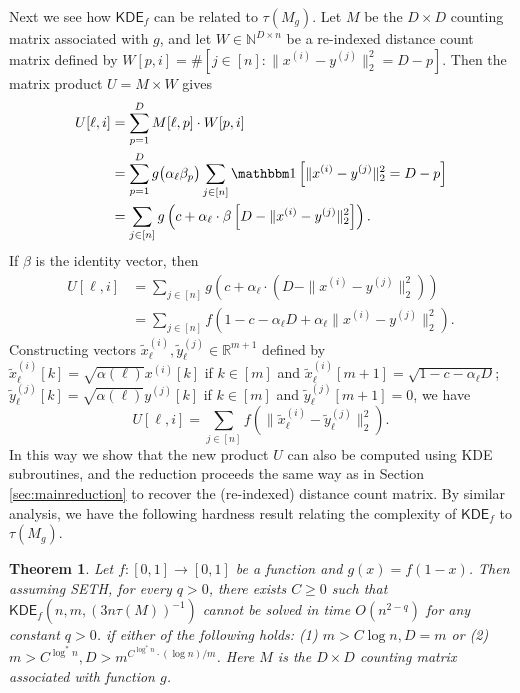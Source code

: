 \documentclass[10pt,a4paper]{article}
\newtheorem{theorem}{Theorem}
\theoremstyle{remark}
\numberwithin{equation}{section}
\numberwithin{theorem}{section}
\newcommand{\N}{\ensuremath{\mathbb{N}}}
\newcommand{\R}{\ensuremath{\mathbb{R}}}
\newcommand{\ind}{\mathbbm 1}
\newcommand{\KDE}{\mathsf{KDE}}
\begin{document}
Next we see how $\KDE_f$ can be related to $\tau(M_g)$. Let $M$ be the $D \times D$ counting matrix associated with $g$, and let $W \in \N^{D\times n}$ be a re-indexed distance count matrix defined by $W[p, i] = \#[j\in [n]: \|x^{(i)}-y^{(j)}\|_2^2 = D-p]$. Then the matrix product $U = M \times W$ gives 
\begin{align}
U[\ell, i] &= \sum_{p=1}^D M[\ell, p] \cdot W[p, i] \notag\\ 
&=\sum_{p=1}^D g\big(\alpha_\ell\beta_p\big) 
\sum_{j \in [n]} \ind\left[\|x^{(i)} - y^{(j)}\|_2^2 = D-p\right] \notag\\
&=\sum_{j \in [n]} g\left(c + \alpha_\ell \cdot \beta\left[D-\|x^{(i)} - y^{(j)}\|_2^2\right]\right).
\end{align}
If $\beta$ is the identity vector, then
\begin{align*}
U[\ell, i] &=\sum_{j \in [n]} g\left(c + \alpha_\ell \cdot (D-\|x^{(i)} - y^{(j)}\|_2^2)\right) \\
&=\sum_{j \in [n]} f\left(1 - c - \alpha_\ell D + \alpha_\ell \|x^{(i)} - y^{(j)}\|_2^2 \right).
\end{align*}
Constructing vectors $\tilde x_{\ell}^{(i)}, \tilde y_{\ell}^{(j)} \in \R^{m+1}$ defined by $\tilde x_{\ell}^{(i)}[k] = \sqrt{\alpha(\ell)} x^{(i)}[k]$ if $k \in [m]$ and $\tilde x_{\ell}^{(i)}[m+1] = \sqrt {1-c-\alpha_{\ell}D}$;
$\tilde y_{\ell}^{(j)}[k] = \sqrt{\alpha(\ell)} y^{(j)}[k]$ if $k \in [m]$ and $\tilde y_{\ell}^{(j)}[m+1] = 0$,
we have
\[U[\ell, i] = \sum_{j \in [n]}f(\|\tilde x_{\ell}^{(i)} - \tilde y_\ell^{(j)}\|_2^2).\]
In this way we show that the new product $U$ can also be computed using KDE subroutines, and the reduction proceeds the same way as in Section \ref{sec:mainreduction} to recover the (re-indexed) distance count matrix.
By similar analysis, we have the following hardness result relating the complexity of $\KDE_f$ to $\tau(M_g)$.
\begin{theorem} \label{thm:pdkdehardness}
Let $f: [0, 1]\rightarrow [0, 1]$ be a function and $g(x) = f(1-x)$.
Then assuming SETH, for every $q > 0$, there exists $C \ge 0$ such that $\KDE_f(n, m, (3n\tau(M))^{-1})$
cannot be solved in time $O(n^{2-q})$ for any constant $q>0$. if either of the following holds: (1) $m > C \log n, D = m$ or (2) $m > C^{\log^* n}, D > m^{C^{\log^* n} \cdot (\log n)/m}$. Here $M$ is the $D \times D$ counting matrix associated with function $g$.
\end{theorem}
\end{document}
